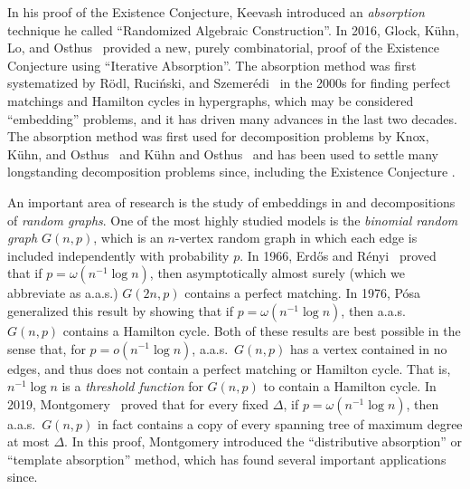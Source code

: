 \documentclass[11pt]{article}
\numberwithin{equation}{section}
\newcounter{i}
\theoremstyle{plain}
\theoremstyle{plain} %
\theoremstyle{definition}
\newcommand{\aas}{a.a.s.\ }
\begin{document}
In his proof of the Existence Conjecture, Keevash introduced an \textit{absorption} technique he called ``Randomized Algebraic Construction''.  In 2016, Glock, K\"uhn, Lo, and Osthus~\cite{GKLO16} provided a new, purely combinatorial, proof of the Existence Conjecture using ``Iterative Absorption''.  The absorption method was first systematized by R\"odl, Ruci\'{n}ski, and Szemer\'edi~\cite{RRS06, RRS06pm, RRS08, RRS09} in the 2000s for finding perfect matchings and Hamilton cycles in hypergraphs, which may be considered ``embedding'' problems, and it has driven many advances in the last two decades.  The absorption method was first used for decomposition problems by Knox, K\"uhn, and Osthus~\cite{KKO15} and K\"uhn and Osthus~\cite{KO13} and has been used to settle many longstanding decomposition problems since, including the Existence Conjecture \cite{KO13, K14, Ke18, Ke18EOD, GJKKO21, MPS21, KS20, KKKMO23}.

An important area of research is the study of embeddings in and decompositions of \textit{random graphs}. 
One of the most highly studied models is the \textit{binomial random graph $G(n,p)$}, which is an $n$-vertex random graph in which each edge is included independently with probability $p$.
In 1966, Erd\H{o}s and R\'{e}nyi~\cite{ER66} proved that if $p = \omega(n^{-1}\log n)$, then asymptotically almost surely (which we abbreviate as a.a.s.) $G(2n,p)$ contains a perfect matching.  In 1976, P\'osa~\cite{Po76} generalized this result by showing that if $p = \omega(n^{-1}\log n)$, then \aas $G(n,p)$ contains a Hamilton cycle.  
Both of these results are best possible in the sense that, for $p = o(n^{-1}\log n)$, \aas $G(n,p)$ has a vertex contained in no edges, and thus does not contain a perfect matching or Hamilton cycle.  That is, $n^{-1}\log n$ is a \textit{threshold function} for $G(n,p)$ to contain a Hamilton cycle.  In 2019, Montgomery~\cite{Mo19} proved that for every fixed $\Delta$, if $p = \omega(n^{-1}\log n)$, then \aas $G(n,p)$ in fact contains a copy of every spanning tree of maximum degree at most $\Delta$.  In this proof, Montgomery introduced the ``distributive absorption'' or ``template absorption'' method, which has found several important applications since. 
\end{document}
